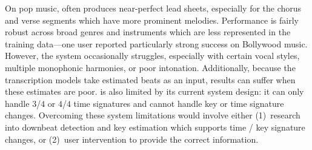 On pop music, \sheetsage{} often produces near-perfect lead sheets, especially for the chorus and verse segments which have more prominent melodies. 
Performance is fairly robust across broad genres and instruments which are less represented in the training data---one user reported particularly strong success on Bollywood music. 
However, the system occasionally struggles, especially with certain vocal styles, multiple monophonic harmonies, or poor intonation. 
Additionally, because the transcription models take estimated beats as an input, results can suffer when these estimates are poor. 
\sheetsage{} is also limited by its current system design: it can only handle $3$/$4$ or $4$/$4$ time signatures and cannot handle key or time signature changes. 
Overcoming these system limitations would involve either (1)~research into downbeat detection and key estimation which supports time / key signature changes, or (2)~user intervention to provide the correct information.
